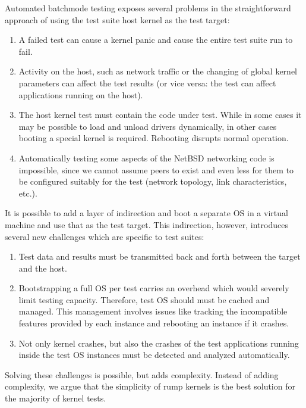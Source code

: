 Automated batchmode testing exposes several problems in the straightforward
approach of using the test suite host kernel as the test target:

\begin{enumerate}
\item   A failed test can cause a kernel panic and cause the
	entire test suite run to fail.

\item   Activity on the host, such as network traffic or the changing
	of global kernel parameters can affect the test results
	(or vice versa: the test can affect applications running
	on the host).

\item   The host kernel test must contain the code under test.
	While in some cases it may be possible to load and unload
	drivers dynamically, in other cases booting a special kernel
	is required.  Rebooting disrupts normal operation.

\item   Automatically testing \eg some aspects of the NetBSD
	networking code is impossible, since we cannot assume peers
	to exist and even less for them to be configured suitably
	for the test (network topology, link characteristics, etc.).
\end{enumerate}

It is possible to add a layer of indirection and boot a separate
OS in a virtual machine and use that as the test target.  This indirection,
however, introduces several new challenges which are specific to
test suites:

\begin{enumerate}
\item   Test data and results must be transmitted back and forth
	between the target and the host.

\item   Bootstrapping a full OS per test carries an overhead which
	would severely limit testing capacity.  Therefore, test OS
	should must be cached and managed.  This management involves issues
	like tracking the incompatible features provided by each
	instance and rebooting an instance if it crashes.

\item   Not only kernel crashes, but also the crashes of the test
	applications running inside the test OS instances must be
	detected and analyzed automatically.
\end{enumerate}

Solving these challenges is possible, but adds complexity.  Instead
of adding complexity, we argue that the simplicity of rump kernels
is the best solution for the majority of kernel tests.

